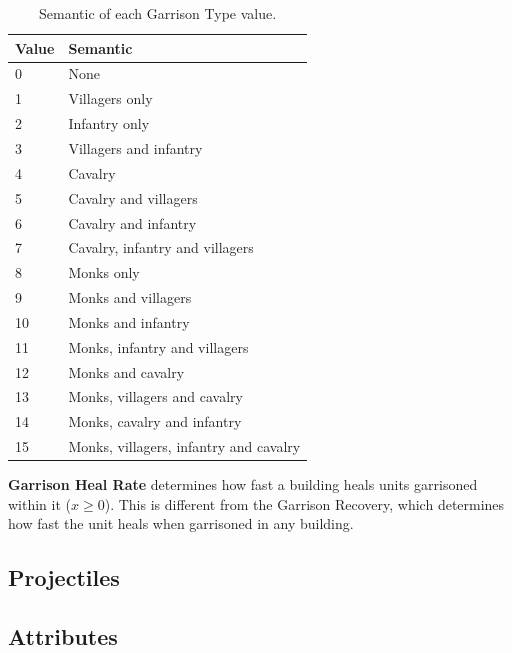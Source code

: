     \begin{table}[ht]
        \centering
        \begin{tabular}{ll}
            \toprule
            Value & Semantic \\
            \midrule
            0   &   None \\
            1  &  Villagers only \\
            2  &  Infantry only \\
            3  &  Villagers and infantry \\
            4  &  Cavalry \\
            5  &  Cavalry and villagers \\
            6  &  Cavalry and infantry \\
            7  &  Cavalry, infantry and villagers \\
            8  &  Monks only \\
            9  &  Monks and villagers \\
            10  &  Monks and infantry \\
            11  &  Monks, infantry and villagers \\
            12  &  Monks and cavalry \\
            13  &  Monks, villagers and cavalry \\
            14  &  Monks, cavalry and infantry \\
            15  &  Monks, villagers, infantry and cavalry \\
            \bottomrule
        \end{tabular}
        \caption{Semantic of each Garrison Type value.}
        \label{tbl:garrisontype}
    \end{table}

    \textbf{Garrison Heal Rate} determines how fast a building heals units garrisoned within it ($x \geq 0$). This is different from the Garrison Recovery, which determines how fast the unit heals when garrisoned in any building\cite{agewiki:2014}.

    \subsection{Projectiles}

    \subsection{Attributes}

